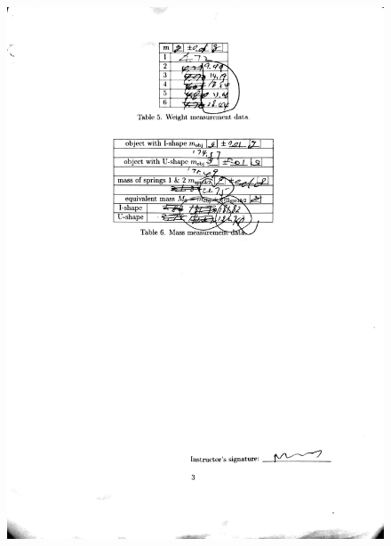 \documentclass[a4paper]{report}
\begin{document}
	\begin{figure}[H]
		\centering
		\includegraphics[width=1\linewidth]{15.jpg}
	\end{figure}
\end{document}
